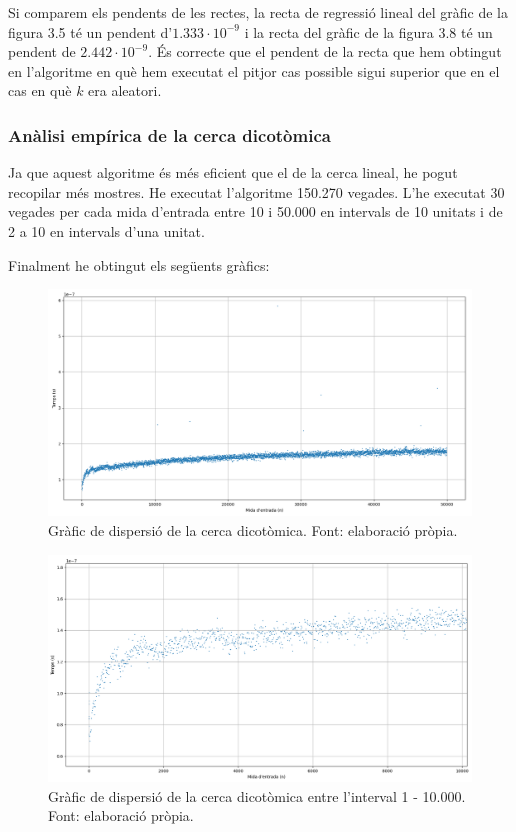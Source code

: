 Si comparem els pendents de les rectes, la recta de regressió lineal del gràfic de la figura 3.5 té un pendent d'$1.333 \cdot 10^{-9}$ i la recta del gràfic de la figura 3.8 té un pendent de $2.442 \cdot 10^{-9}$. És correcte que el pendent de la recta que hem obtingut en l'algoritme en què hem executat el pitjor cas possible sigui superior que en el cas en què $k$ era aleatori. 

\subsubsection{Anàlisi empírica de la cerca dicotòmica}
Ja que aquest algoritme és més eficient que el de la cerca lineal, he pogut recopilar més mostres. He executat l'algoritme 150.270 vegades. L'he executat 30 vegades per cada mida d'entrada entre 10 i 50.000 en intervals de 10 unitats i de 2 a 10 en intervals d'una unitat.

\newpage
Finalment he obtingut els següents gràfics:
\begin{figure}[H]
    \centering
    \includegraphics[width=1\textwidth]{capitols/figures/5.png}
    \caption[Gràfic de dispersió de la cerca dicotòmica.]{Gràfic de dispersió de la cerca dicotòmica. Font: elaboració pròpia.}
    \label{fig:my_label}
\end{figure}
\begin{figure}[H]
    \centering
    \includegraphics[width=1\textwidth]{capitols/figures/6.png}
    \caption[Gràfic de dispersió de la cerca dicotòmica entre l'interval 1 - 10.000.]{Gràfic de dispersió de la cerca dicotòmica entre l'interval 1 - 10.000. Font: elaboració pròpia.}
    \label{fig:my_label}
\end{figure}

